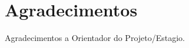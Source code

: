 \label{Agradecimentos}
\cleardoublepage
\section*{Agradecimentos}
Agradecimentos a Orientador do Projeto/Estagio.

